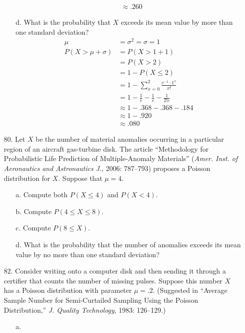 \documentclass[letterpaper,12pt]{article}
\newcommand{\poisson}[2]{%
  \frac{e^{-#2} \cdot #2^{#1}}{#1!}%
}
\newcommand{\poissonsum}[3]{%
  \sum_{x = #1}^{#2} \poisson{x}{#3}%
}
\begin{document}
\begin{enumerate}
\begin{enumerate}
\begin{align*}
          &\approx .260
        \end{align*}
      \item[d.]
        What is the probability that $X$ exceeds its mean value by more than one standard deviation?
        \begin{align*}
          \mu &= \sigma^2 = \sigma = 1 \\
          P(X > \mu + \sigma) &= P(X > 1 + 1) \\
          &= P(X > 2) \\
          &= 1 - P(X \le 2) \\
          &= 1 - \poissonsum{0}{2}{1} \\
          &= 1 - \frac{1}{e} - \frac{1}{e} - \frac{1}{2!e} \\
          &\approx 1 - .368 - .368 - .184 \\
          &\approx 1 - .920 \\
          &\approx .080
        \end{align*}
    \end{enumerate}
  \item[80.]
    Let $X$ be the number of material anomalies occurring in a particular region of an aircraft gas-turbine disk. The article ``Methodology for Probabilistic Life Prediction of Multiple-Anomaly Materials'' (\textit{Amer. Inst. of Aeronautics and Astronautics J.}, 2006: 787–793) proposes a Poisson distribution for $X$. Suppose that $\mu = 4$.
    \begin{enumerate}
      \item[a.]
        Compute both $P(X \le 4)$ and $P(X < 4)$.
      \item[b.]
        Compute $P(4 \le X \le 8)$.
      \item[c.]
        Compute $P(8 \le X)$.
      \item[d.]
        What is the probability that the number of anomalies exceeds its mean value by no more than one standard deviation?
    \end{enumerate}
  \item[82.]
    Consider writing onto a computer disk and then sending it through a certifier that counts the number of missing pulses. Suppose this number $X$ has a Poisson distribution with parameter $\mu = .2$. (Suggested in ``Average Sample Number for Semi-Curtailed Sampling Using the Poisson Distribution,'' \textit{J. Quality Technology}, 1983: 126–129.)
    \begin{enumerate}
      \item[a.]

\end{enumerate}
\end{enumerate}
\end{document}
